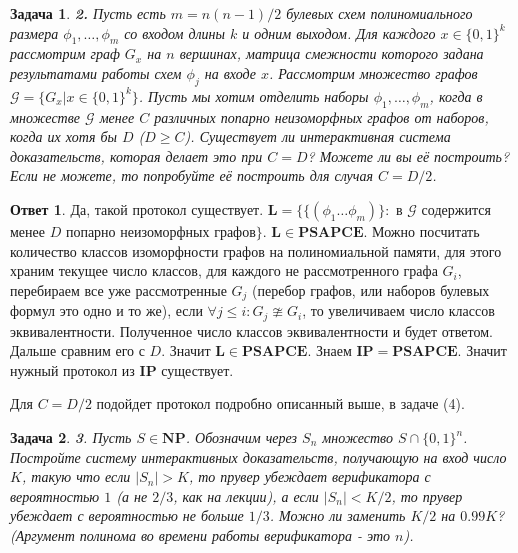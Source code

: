 \documentclass[a4paper]{article}
\theoremstyle{plain}
\newtheorem*{task}{Задача}
\theoremstyle{definition}
\newtheorem*{answer}{Ответ}
\begin{document}
\begin{task} \textbf{2.}
Пусть есть $m=n(n-1)/2$ булевых схем полиномиального размера $\phi_1, \ldots, \phi_m$ со входом длины $k$ и одним выходом. Для каждого $x \in \{0,1\}^k$ рассмотрим граф $G_x$ на $n$ вершинах, матрица смежности которого задана результатами работы схем $\phi_j$ на входе $x$. Рассмотрим множество графов $\mathcal{G}=\{G_x | x \in \{0,1\}^k\}$. Пусть мы хотим отделить наборы $\phi_1, \ldots, \phi_m$, когда в множестве $\mathcal{G}$ менее $C$ различных попарно неизоморфных графов от наборов, когда их хотя бы $D$ ($D \ge C$). Существует ли интерактивная система доказательств, которая делает это при $C=D$? Можете ли вы её построить? Если не можете, то попробуйте её построить для случая $C=D/2$.
\end{task}

\begin{answer}
Да, такой протокол существует. $\mathbf{L} = \{\{(\phi_1 \ldots \phi_m)\}: $ в $\mathcal{G}$ содержится менее $D$ попарно неизоморфных графов$\}$. $\mathbf{L} \in \mathbf{PSAPCE}$. Можно посчитать количество классов изоморфности графов на полиномиальной памяти, для этого храним текущее число классов, для каждого не рассмотренного графа $G_i$, перебираем все уже рассмотренные $G_j$ (перебор графов, или наборов булевых формул это одно и то же), если $\forall j \leq i : G_j \ncong G_i$, то увеличиваем число классов эквивалентности. Полученное число классов эквивалентности и будет ответом. Дальше сравним его с $D$. Значит $\mathbf{L} \in \mathbf{PSAPCE}$. Знаем $\mathbf{IP} = \mathbf{PSAPCE}$. Значит нужный протокол из $\mathbf{IP}$ существует. 

Для $C = D/2$ подойдет протокол подробно описанный выше, в задаче (4).
\end{answer}



\begin{task}{\textbf 3.}
Пусть $S \in \mathbf{NP}$. Обозначим через $S_n$ множество $S \cap \{0,1\}^n$. Постройте систему интерактивных доказательств, получающую на вход число $K$, такую что если $|S_n| > K$, то прувер убеждает верификатора с вероятностью $1$ (а не $2/3$, как на лекции), а если $|S_n|<K/2$, то прувер убеждает с вероятностью не больше $1/3$. Можно ли заменить $K/2$ на $0.99K$? (Аргумент полинома во времени работы верификатора - это $n$).
\end{task} 
\end{document}
